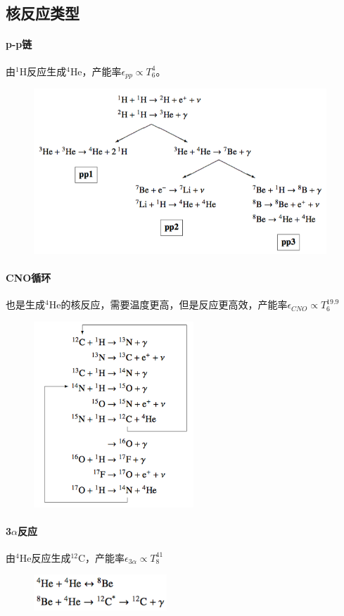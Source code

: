 \documentclass[openany]{ctexbook}
\begin{document}
\newpage
\subsection{核反应类型}
\paragraph{p-p链}
由$^1$H反应生成$^4$He，产能率$\epsilon_{pp}\propto T_6^4$。
\begin{figure}[hbt]
  \centering
  \includegraphics[width=11cm]{chapters/10/ppchains}
  \label{}
\end{figure}


\paragraph{CNO循环}
也是生成$^4$He的核反应，需要温度更高，但是反应更高效，产能率$\epsilon_{CNO}\propto T_6^{19.9}$
\begin{figure}[hbt]
  \centering
  \includegraphics[width=6cm]{chapters/10/cno}
  \label{}
\end{figure}

\paragraph{3$\alpha$反应}
由$^4$He反应生成$^{12}$C，产能率$\epsilon_{3\alpha}\propto T_8^{41}$
\begin{figure}[hbt]
  \centering
  \includegraphics[width=5cm]{chapters/10/3alpha}
  \label{}
\end{figure}
\end{document}
